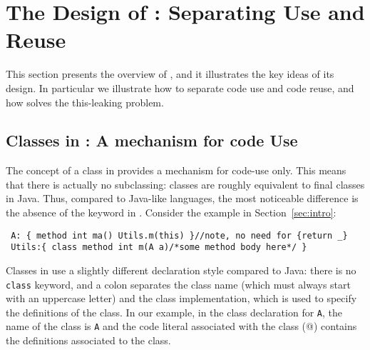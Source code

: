 \saveSpace\saveSpace\saveSpace
\section{The Design of \name: Separating Use and Reuse}\label{sec:separate}
\saveSpace\saveSpace\saveSpace
This section presents the overview of \name, and it illustrates the
key ideas of its design. In particular we illustrate how to separate code use and 
code reuse, and how \name solves the this-leaking problem.

\saveSpace\saveSpace
\subsection{Classes in \name: A mechanism for code Use}
\saveSpace
The concept of a class in \name provides a mechanism for code-use
only. This means that there is actually no subclassing:
classes are roughly equivalent to final classes in Java.  Thus,
compared to Java-like languages, the most noticeable difference is the
absence of the \Q@extends@ keyword in \name. 
Consider the example in Section~\ref{sec:intro}:
\saveSpace
\begin{lstlisting}
 A: { method int ma() Utils.m(this) }//note, no need for {return _}
 Utils:{ class method int m(A a)/*some method body here*/ }
\end{lstlisting} 
\saveSpace
\noindent Classes in \name use a slightly different declaration style compared
to Java: there is no \lstinline{class} keyword, and a colon separates the class name (which must always start with
an uppercase letter) and the class implementation, which is used to specify the
definitions of the class. In our example, in the class declaration
for \lstinline{A}, the name of the class is \lstinline{A} and the code 
literal associated with the class (@) contains the definitions associated to the
class.


